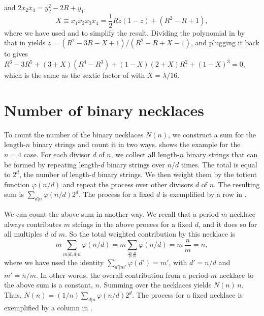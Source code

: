 \documentclass[twocolumn]{revtex4-1}
\begin{document}
and $2 x_2 x_4 = y_2^2 - 2 R + y_1$,
%
\begin{equation}
  X \equiv x_1 x_2 x_3 x_4 = \frac{1}{2} R z(1 - z) + (R^2 - R + 1),
\label{eq:der4}
\end{equation}
where we have used  and  to simplify the result.
%
Dividing the polynomial in  by that in 
yields $z = (R^2-3R-X+1)/(R^2-R+X-1)$,
and plugging it back to  gives
   $R^6 -3 R^5
  + (3 + X) (R^4 - R^3)
  + (1 - X) (2 + X) R^2
  + (1 - X)^3 = 0$,
which is the same as the sextic factor of 
  with $X = \lambda/16$.




\section{\label{apd:bnecklace}Number of binary necklaces}




To count the number of the binary necklaces $N(n)$,
we construct a sum for the length-$n$ binary strings and count it in two ways.
 shows the example for the $n=4$ case.
%
For each divisor $d$ of $n$, we collect
  all length-$n$ binary strings
  that can be formed by repeating
  length-$d$ binary strings over $n/d$ times.
%
The total is equal to $2^d$, the number of length-$d$ binary strings.
%
We then weight them by the totient function $\varphi(n/d)$
%
and repeat the process over other divisors $d$ of $n$.
%
The resulting sum is $\sum_{d|n} \varphi(n/d) 2^d$.
%
The process for a fixed $d$ is exemplified
  by a row in .
%


We can count the above sum in another way.
We recall that a period-$m$ necklace always contributes
  $m$ strings in the above process for a fixed $d$,
  and it does so for all multiples $d$ of $m$.
So the total weighted contribution by this necklace is
\begin{equation}
m \sum_{m|d, d|n} \varphi(n/d) =
 m \sum_{\frac{n}{d}|\frac{n}{m}} \varphi(n/d) = m \,  \frac{n}{m}  = n,
\label{eq:mphind}
\end{equation}
where we have used the identity $\sum_{d'|m'} \varphi(d') = m'$,
with $d' = n/d$ and $m' = n/m$.
%
In other words, the overall contribution from a period-$m$ necklace
  to the above sum is a constant, $n$.
% 
Summing over the necklaces yields $N(n) \, n$. Thus,
$N(n) = (1/n) \sum_{d|n} \varphi(n/d) 2^d$.
The process for a fixed necklace is exemplified
  by a column in .
%
\end{document}

